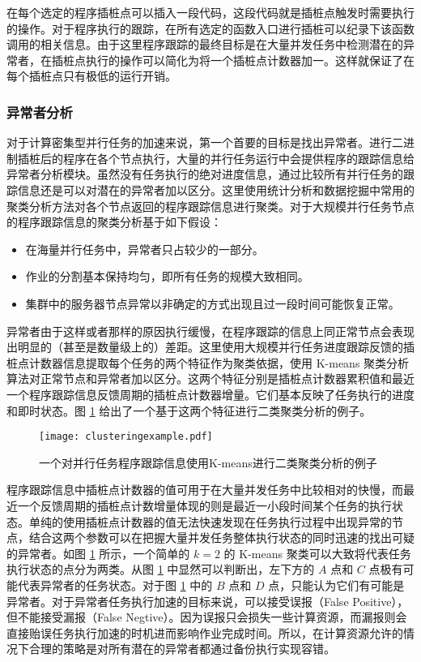 在每个选定的程序插桩点可以插入一段代码，这段代码就是插桩点触发时需要执行的操作。对于程序执行的跟踪，在所有选定的函数入口进行插桩可以纪录下该函数调用的相关信息。由于这里程序跟踪的最终目标是在大量并发任务中检测潜在的异常者，在插桩点执行的操作可以简化为将一个插桩点计数器加一。这样就保证了在每个插桩点只有极低的运行开销。

\subsubsection{异常者分析}
\label{subsec:no2_clustering}
对于计算密集型并行任务的加速来说，第一个首要的目标是找出异常者。进行二进制插桩后的程序在各个节点执行，大量的并行任务运行中会提供程序的跟踪信息给异常者分析模块。虽然没有任务执行的绝对进度信息，通过比较所有并行任务的跟踪信息还是可以对潜在的异常者加以区分。这里使用统计分析和数据挖掘中常用的聚类分析方法对各个节点返回的程序跟踪信息进行聚类。对于大规模并行任务节点的程序跟踪信息的聚类分析基于如下假设：
\begin{itemize}
\item 在海量并行任务中，异常者只占较少的一部分。
\item 作业的分割基本保持均匀，即所有任务的规模大致相同。
\item 集群中的服务器节点异常以非确定的方式出现且过一段时间可能恢复正常。
\end{itemize}

异常者由于这样或者那样的原因执行缓慢，在程序跟踪的信息上同正常节点会表现出明显的（甚至是数量级上的）差距。这里使用大规模并行任务进度跟踪反馈的插桩点计数器信息提取每个任务的两个特征作为聚类依据，使用 K-means 聚类分析算法对正常节点和异常者加以区分。这两个特征分别是插桩点计数器累积值和最近一个程序跟踪信息反馈周期的插桩点计数器增量。它们基本反映了任务执行的进度和即时状态。图 \ref{figure:clusteringexample} 给出了一个基于这两个特征进行二类聚类分析的例子。
\begin{figure}
  \centering
  \texttt{[image: clusteringexample.pdf]}
  \caption{一个对并行任务程序跟踪信息使用K-means进行二类聚类分析的例子}
  \label{figure:clusteringexample}
\end{figure}

程序跟踪信息中插桩点计数器的值可用于在大量并发任务中比较相对的快慢，而最近一个反馈周期的插桩点计数增量体现的则是最近一小段时间某个任务的执行状态。单纯的使用插桩点计数器的值无法快速发现在任务执行过程中出现异常的节点，结合这两个参数可以在把握大量并发任务整体执行状态的同时迅速的找出可疑的异常者。如图 \ref{figure:clusteringexample} 所示，一个简单的 $k = 2$ 的 K-means 聚类可以大致将代表任务执行状态的点分为两类。从图 \ref{figure:clusteringexample} 中显然可以判断出，左下方的 $A$ 点和 $C$ 点极有可能代表异常者的任务状态。对于图 \ref{figure:clusteringexample} 中的 $B$ 点和 $D$ 点，只能认为它们有可能是异常者。对于异常者任务执行加速的目标来说，可以接受误报（False Positive），但不能接受漏报（False Negtive）。因为误报只会损失一些计算资源，而漏报则会直接贻误任务执行加速的时机进而影响作业完成时间。所以，在计算资源允许的情况下合理的策略是对所有潜在的异常者都通过备份执行实现容错。

